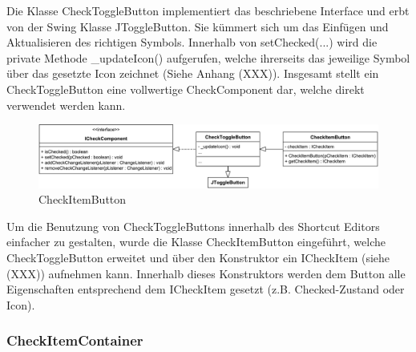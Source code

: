 Die Klasse CheckToggleButton implementiert das beschriebene Interface und erbt von der Swing Klasse JToggleButton. Sie kümmert sich um das Einfügen und Aktualisieren des richtigen Symbols. Innerhalb von setChecked(...) wird die private Methode \_updateIcon() aufgerufen, welche ihrerseits das jeweilige Symbol über das gesetzte Icon zeichnet (Siehe Anhang (XXX)). Insgesamt stellt ein CheckToggleButton eine vollwertige CheckComponent dar, welche direkt verwendet werden kann.

\begin{figure}[H]
	\centering
	\includegraphics[width=1\linewidth]{../graphic/diagrams/CD_CheckButton/CD_CheckButton}
	\caption{CheckItemButton}
	\label{fig:cdcheckbutton}
\end{figure}

\vspace{-5px}

Um die Benutzung von CheckToggleButtons innerhalb des Shortcut Editors einfacher zu gestalten, wurde die Klasse CheckItemButton eingeführt, welche CheckToggleButton erweitet und über den Konstruktor ein ICheckItem (siehe (XXX)) aufnehmen kann. Innerhalb dieses Konstruktors werden dem Button alle Eigenschaften entsprechend dem ICheckItem gesetzt (z.B. Checked-Zustand oder Icon).

\vspace{-5px}

\subsubsection{CheckItemContainer}

